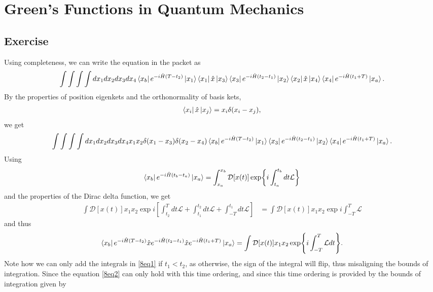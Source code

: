 \section{Green's Functions in Quantum Mechanics}
\subsection{Exercise}

Using completeness, we can write the equation in the packet as
\begin{equation}
    \int \int \int \int dx_1dx_2dx_3dx_4 \bra{x_b}e^{-i\hat H (T-t_2)}\ket{x_1}\bra{x_1}\hat x \ket{x_3}\bra{x_3} e^{-i\hat H (t_2-t_1)}\ket{x_2}\bra{x_2} \hat x \ket{x_4}\bra{x_4}e^{-i\hat H (t_1+T)}\ket{x_a}.
\end{equation}
By the properties of position eigenkets and the orthonormality of basis kets,
\begin{align}
    \bra{x_i}\hat x \ket{x_j} = x_i \delta(x_i-x_j),
\end{align}
we get 
\begin{equation}
    \int \int \int \int dx_1dx_2dx_3dx_4 x_1x_2\delta(x_1-x_3)\delta(x_2-x_4)\bra{x_b}e^{-i\hat H (T-t_2)} \ket{x_1}\bra{x_3}e^{-i\hat H (t_2-t_1)}\ket{x_2}\bra{x_4}e^{-i\hat H (t_1+T)}\ket{x_a}.
\end{equation}
Using 
\begin{equation}
    \label{ketint}
    \bra{x_b}e^{-i\hat H (t_b-t_a)}\ket{x_a}=\int_{x_a}^{x_b} \mathcal{D}[x(t)] \exp{i \int_{t_a}^{t_b} dt \mathcal{L}}
\end{equation}
and the properties of the Dirac delta function, we get
\begin{align}
\label{8eq1}
    \int \mathcal D [x(t)] x_1x_2 \exp{i [\int_{t_2}^T dt \mathcal L+\int_{t_1}^{t_2} dt \mathcal L+\int_{-T}^{t_1} dt \mathcal L]}&
    = \int \mathcal D [x(t)] x_1 x_2 \exp{i \int_{-T}^T \mathcal L}
\end{align}
and thus
\begin{equation}
\label{8eq2}
    \bra{x_b}e^{-i\hat H (T-t_2)}\hat x e^{-i\hat H (t_2-t_1)}\hat x e^{-i\hat H (t_1+T)}\ket{x_a} = \int \mathcal D [x(t)] x_1 x_2 \exp{i \int_{-T}^T \mathcal L dt}.
\end{equation}
Note how we can only add the integrals in \eqref{8eq1} if $t_1<t_2$, as otherwise, the sign of the integral will flip, thus misaligning the bounds of integration. Since the equation \eqref{8eq2} can only hold with this time ordering, and since this time ordering is provided by the bounds of integration given by 
